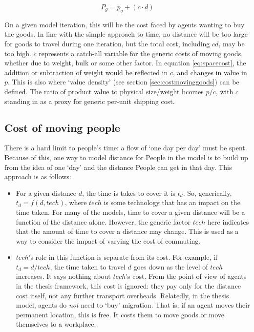 \begin{equation}
P_g = p_g + (c\cdot d)
\label{eq:spacecost}
\end{equation}

On a given model iteration, this will be the cost faced by agents wanting to buy the goods. In line with the simple approach to time, no distance will be too large for goods to travel during one iteration, but the total cost, including $cd$, may be too high. $c$ represents a catch-all variable for the generic costs of moving goods, whether due to weight, bulk or some other factor. In equation \eqref{eq:spacecost}, the addition or subtraction of weight would be reflected in $c$, and changes in value in $p$. This is also where `value density' (see section \ref{sec:costmovinggoods}) can be defined. The ratio of product value to physical size/weight bcomes $p/c$, with $c$ standing in as a proxy for generic per-unit shipping cost. 
\subsection{Cost of moving people \label{sec:peoplemovingFramework}}

There is a hard limit to people's time: a flow of `one day per day' must be spent. Because of this, one way to model distance for People in the model is to build up from the idea of one `day' and the distance People can get in that day. This approach is as follows: 

\begin{itemize}
\item For a given distance $d$, the time is takes to cover it is $t_{d}$. So, generically, $t_{d}=f(d,tech)$, where $tech$ is some technology that has an impact on the time taken. For many of the models, time to cover a given distance will be a function of the distance alone. However, the generic factor $tech$ here indicates that the amount of time to cover a distance may change. This is used as a way to consider the impact of varying the cost of commuting.
\item $tech$'s role in this function is separate from its cost. For example, if $t_{d}=d/tech$, the time taken to travel $d$ goes down as the level of $tech$ increases. It says nothing about $tech$'s cost. From the point of view of agents in the thesis framework, this cost is ignored: they pay only for the distance cost itself, not any further transport overheads. Relatedly, in the thesis model, agents do \emph{not} need to `buy' migration. That is, if an agent moves their permanent location, this is free. It costs them to move goods or move themselves to a workplace.
\end{itemize}

